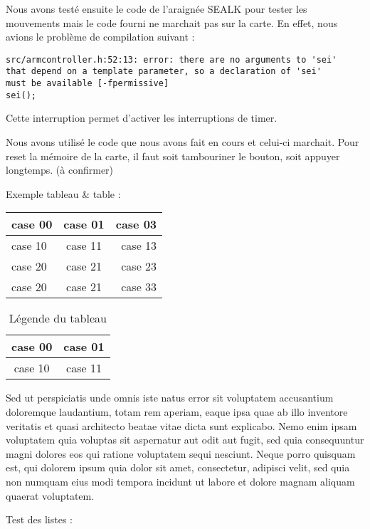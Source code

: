 Nous avons testé ensuite le code de l'araignée SEALK pour tester les mouvements mais le code fourni ne marchait pas sur la carte.
En effet, nous avions le problème de compilation suivant :
\begin{lstlisting}
src/armcontroller.h:52:13: error: there are no arguments to 'sei' 
that depend on a template parameter, so a declaration of 'sei' 
must be available [-fpermissive]
sei();
\end{lstlisting}
Cette interruption permet d'activer les interruptions de timer.

Nous avons utilisé le code que nous avons fait en cours et celui-ci marchait.
Pour reset la mémoire de la carte, il faut soit tambouriner le bouton, soit appuyer longtemps. (à confirmer)

Exemple tableau \& table : 

\begin{tabular}{|l|c|r|}
	\hline \textbf{case 00} & \textbf{case 01} & \textbf{case 03} \\
	\hline case 10 & case 11 & case 13 \\ 
	case 20 & case 21 & case 23 \\ 
	case 20 & case 21 & case 33 \\ 
	\hline
\end{tabular}

\begin{table}
\begin{center}
	\begin{tabular}{|c|c|}
		\hline case 00 & case 01 \\
		\hline case 10 & case 11 \\ 
		\hline 
	\end{tabular}
	\caption{Légende du tableau}
\end{center}
\end{table}


Sed ut perspiciatis unde omnis iste natus error sit voluptatem accusantium doloremque laudantium, totam rem aperiam, eaque ipsa quae ab illo inventore veritatis et quasi architecto beatae vitae dicta sunt explicabo. Nemo enim ipsam voluptatem quia voluptas sit aspernatur aut odit aut fugit, sed quia consequuntur magni dolores eos qui ratione voluptatem sequi nesciunt. Neque porro quisquam est, qui dolorem ipsum quia dolor sit amet, consectetur, adipisci velit, sed quia non numquam eius modi tempora incidunt ut labore et dolore magnam aliquam quaerat voluptatem. 

Test des listes : 

